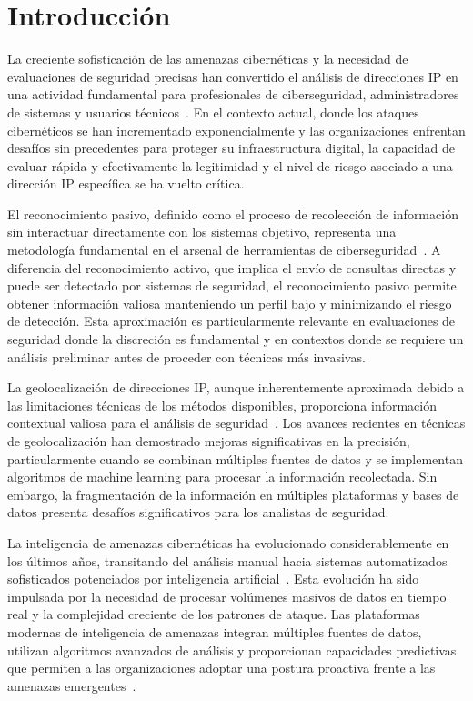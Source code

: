 \section{Introducción}
La creciente sofisticación de las amenazas cibernéticas y la necesidad de evaluaciones de seguridad precisas han convertido el análisis de direcciones IP en una actividad fundamental para profesionales de ciberseguridad, administradores de sistemas y usuarios técnicos~\cite{1}. En el contexto actual, donde los ataques cibernéticos se han incrementado exponencialmente y las organizaciones enfrentan desafíos sin precedentes para proteger su infraestructura digital, la capacidad de evaluar rápida y efectivamente la legitimidad y el nivel de riesgo asociado a una dirección IP específica se ha vuelto crítica.

El reconocimiento pasivo, definido como el proceso de recolección de información sin interactuar directamente con los sistemas objetivo, representa una metodología fundamental en el arsenal de herramientas de ciberseguridad~\cite{3}. A diferencia del reconocimiento activo, que implica el envío de consultas directas y puede ser detectado por sistemas de seguridad, el reconocimiento pasivo permite obtener información valiosa manteniendo un perfil bajo y minimizando el riesgo de detección. Esta aproximación es particularmente relevante en evaluaciones de seguridad donde la discreción es fundamental y en contextos donde se requiere un análisis preliminar antes de proceder con técnicas más invasivas.

La geolocalización de direcciones IP, aunque inherentemente aproximada debido a las limitaciones técnicas de los métodos disponibles, proporciona información contextual valiosa para el análisis de seguridad~\cite{4}. Los avances recientes en técnicas de geolocalización han demostrado mejoras significativas en la precisión, particularmente cuando se combinan múltiples fuentes de datos y se implementan algoritmos de machine learning para procesar la información recolectada. Sin embargo, la fragmentación de la información en múltiples plataformas y bases de datos presenta desafíos significativos para los analistas de seguridad.

La inteligencia de amenazas cibernéticas ha evolucionado considerablemente en los últimos años, transitando del análisis manual hacia sistemas automatizados sofisticados potenciados por inteligencia artificial~\cite{5}. Esta evolución ha sido impulsada por la necesidad de procesar volúmenes masivos de datos en tiempo real y la complejidad creciente de los patrones de ataque. Las plataformas modernas de inteligencia de amenazas integran múltiples fuentes de datos, utilizan algoritmos avanzados de análisis y proporcionan capacidades predictivas que permiten a las organizaciones adoptar una postura proactiva frente a las amenazas emergentes~\cite{2}.


